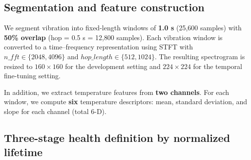 \subsection{Segmentation and feature construction}
We segment vibration into fixed-length windows of \textbf{1.0 s} (25{,}600 samples) with \textbf{50\% overlap} (hop = 0.5 s = 12{,}800 samples). 
Each vibration window is converted to a time--frequency representation using STFT with $n\_fft \in \{2048,4096\}$ and $hop\_length \in \{512,1024\}$. 
The resulting spectrogram is resized to \textbf{$160\times160$} for the development setting and \textbf{$224\times224$} for the temporal fine-tuning setting.

In addition, we extract temperature features from \textbf{two channels}. 
For each window, we compute \textbf{six} temperature descriptors: mean, standard deviation, and slope for each channel (total 6-D).

\subsection{Three-stage health definition by normalized lifetime}
